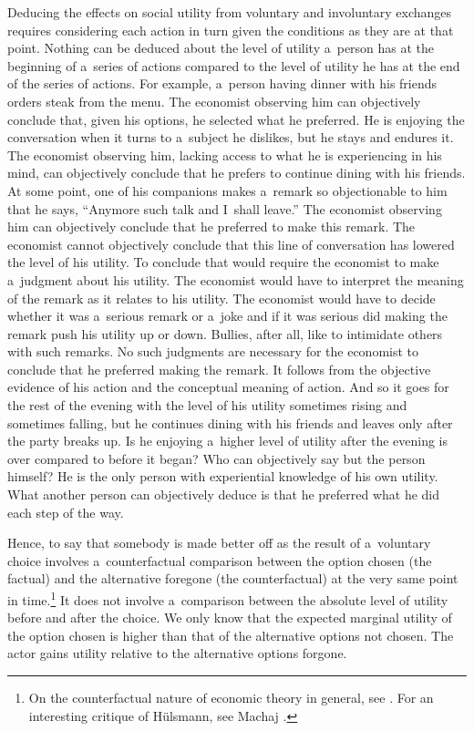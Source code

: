 Deducing the effects on social utility from voluntary and involuntary exchanges requires considering each action in turn given the conditions as they are at that point. Nothing can be deduced about the level of utility a~person has at the beginning of a~series of actions compared to the level of utility he has at the end of the series of actions. For example, a~person having dinner with his friends orders steak from the menu. The economist observing him can objectively conclude that, given his options, he selected what he preferred. He is enjoying the conversation when it turns to a~subject he dislikes, but he stays and endures it. The economist observing him, lacking access to what he is experiencing in his mind, can objectively conclude that he prefers to continue dining with his friends. At some point, one of his companions makes a~remark so objectionable to him that he says, ``Anymore such talk and I~shall leave.'' The economist observing him can objectively conclude that he preferred to make this remark. The economist cannot objectively conclude that this line of conversation has lowered the level of his utility. To conclude that would require the economist to make a~judgment about his utility. The economist would have to interpret the meaning of the remark as it relates to his utility. The economist would have to decide whether it was a~serious remark or a~joke and if it was serious did making the remark push his utility up or down. Bullies, after all, like to intimidate others with such remarks. No such judgments are necessary for the economist to conclude that he preferred making the remark. It follows from the objective evidence of his action and the conceptual meaning of action. And so it goes for the rest of the evening with the level of his utility sometimes rising and sometimes falling, but he continues dining with his friends and leaves only after the party breaks up. Is he enjoying a~higher level of utility after the evening is over compared to before it began? Who can objectively say but the person himself? He is the only person with experiential knowledge of his own utility. What another person can objectively deduce is that he preferred what he did each step of the way. 
\parencite[][p.63]{herbener_defense_2008}%




Hence, to say that somebody is made better off as the result of a~voluntary choice involves a~counterfactual comparison between the option chosen (the factual) and the alternative foregone (the counterfactual) at the very same point in time.\footnote{On the counterfactual nature of economic theory in general, see 
\parencite[][]{hulsmann_facts_2003}. %
 For an interesting critique of Hülsmann, see Machaj 
\parencite*[][]{machaj_counterfactuals_2012}. %
 } It does not involve a~comparison between the absolute level of utility before and after the choice. We only know that the expected marginal utility of the option chosen is higher than that of the alternative options not chosen. The actor gains utility relative to the alternative options forgone.



